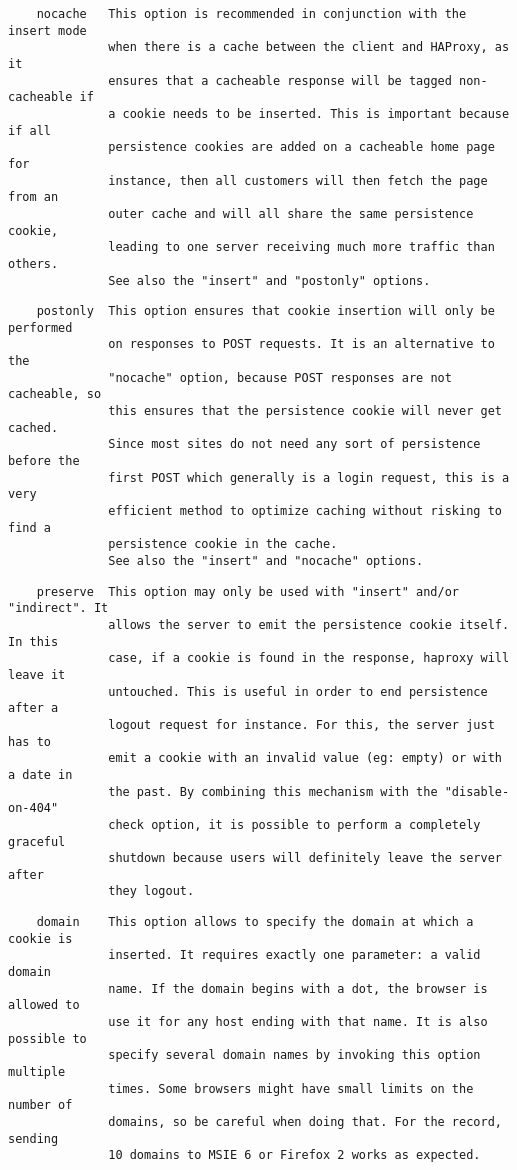 \begin{verbatim}
    nocache   This option is recommended in conjunction with the insert mode
              when there is a cache between the client and HAProxy, as it
              ensures that a cacheable response will be tagged non-cacheable if
              a cookie needs to be inserted. This is important because if all
              persistence cookies are added on a cacheable home page for
              instance, then all customers will then fetch the page from an
              outer cache and will all share the same persistence cookie,
              leading to one server receiving much more traffic than others.
              See also the "insert" and "postonly" options.
\end{verbatim}

\begin{verbatim}
    postonly  This option ensures that cookie insertion will only be performed
              on responses to POST requests. It is an alternative to the
              "nocache" option, because POST responses are not cacheable, so
              this ensures that the persistence cookie will never get cached.
              Since most sites do not need any sort of persistence before the
              first POST which generally is a login request, this is a very
              efficient method to optimize caching without risking to find a
              persistence cookie in the cache.
              See also the "insert" and "nocache" options.
\end{verbatim}

\begin{verbatim}
    preserve  This option may only be used with "insert" and/or "indirect". It
              allows the server to emit the persistence cookie itself. In this
              case, if a cookie is found in the response, haproxy will leave it
              untouched. This is useful in order to end persistence after a
              logout request for instance. For this, the server just has to
              emit a cookie with an invalid value (eg: empty) or with a date in
              the past. By combining this mechanism with the "disable-on-404"
              check option, it is possible to perform a completely graceful
              shutdown because users will definitely leave the server after
              they logout.
\end{verbatim}

\begin{verbatim}
    domain    This option allows to specify the domain at which a cookie is
              inserted. It requires exactly one parameter: a valid domain
              name. If the domain begins with a dot, the browser is allowed to
              use it for any host ending with that name. It is also possible to
              specify several domain names by invoking this option multiple
              times. Some browsers might have small limits on the number of
              domains, so be careful when doing that. For the record, sending
              10 domains to MSIE 6 or Firefox 2 works as expected.
\end{verbatim}

